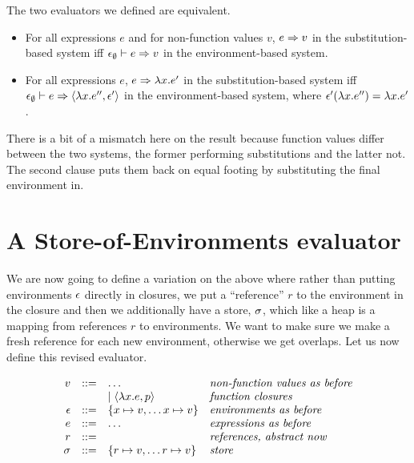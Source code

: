The two evaluators we defined are equivalent.
\begin{lemma} \begin{itemize}
  \item For all expressions $e$ and for non-function values $v$, $e \Rightarrow v$ in the substitution-based system iff $\epsilon_\emptyset \vdash e \Rightarrow v$ in the environment-based system.
  \item For all expressions $e$, $e \Rightarrow \lambda x.e'$ in the substitution-based system iff $\epsilon_\emptyset \vdash e \Rightarrow \langle\lambda x.e'', \epsilon'\rangle$ in the environment-based system, where $\epsilon'(\lambda x.e'') =\lambda x.e'$.
  \end{itemize}
\end{lemma}
There is a bit of a mismatch here on the result because function values differ between the two systems, the former performing substitutions and the latter not.  The second clause puts them back on equal footing by substituting the final environment in.



\section{A Store-of-Environments evaluator}

We are now going to define a variation on the above where rather than putting environments $\epsilon$ directly in closures, we put a ``reference'' $r$ to the environment in the closure and then we additionally have a store, $\sigma$, which like a heap is a mapping from references $r$ to environments.  We want to make sure we make a fresh reference for each new environment, otherwise we get overlaps.  Let us now define this revised evaluator. 

$$
\begin{array}{rcll}
v &::=& \dots & \textit{non-function values as before}\\
  &   & \mid \langle \lambda x. e, p \rangle  & \textit{function closures}\\
\epsilon &::=& \{x \mapsto v, \dots x \mapsto v \}&\textit{environments as before}\\
e &::=& \dots & \textit{expressions as before}\\
r &::=& & \textit{references, abstract now}\\
\sigma &::=& \{r \mapsto v, \dots r \mapsto v\} & \textit{store}
\end{array}
$$
 
